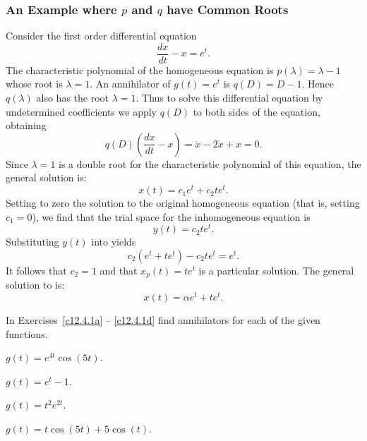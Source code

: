 \documentclass{ximera}
\begin{document}
\subsubsection*{An Example where $p$ and $q$ have Common Roots}

Consider the first order differential equation
\begin{equation}  \label{E:exer4}
\frac{dx}{dt} - x = e^t.
\end{equation}
The characteristic polynomial of the homogeneous equation is 
$p(\lambda)=\lambda-1$ whose root is $\lambda=1$.  An 
annihilator of 
$g(t)=e^t$ is $q(D)=D-1$.  Hence $q(\lambda)$ also has the root $\lambda=1$.
Thus to solve this differential equation by 
undetermined coefficients we
apply $q(D)$ to both sides of the equation, obtaining
\[
q(D) \left(\frac{dx}{dt} - x\right) = \ddot{x} -2\dot{x} +x =0.
\]
Since $\lambda=1$ is a double root for the characteristic polynomial of this 
equation, the general solution is:
\[
x(t) = c_1e^t + c_2te^t.
\]
Setting to zero the solution to the original homogeneous equation (that is, 
setting $c_1=0$), we find that the trial space
for the inhomogeneous equation 
 is
\[
y(t) = c_2te^t.
\] 
Substituting $y(t)$ into  yields
\[
c_2(e^t + te^t) - c_2te^t = e^t.
\] 
It follows that $c_2=1$ and that $x_p(t) = te^t$ is a particular solution. 
The general solution to  is:
\[
x(t) = \alpha e^t + te^t.
\]


\EXER

\TEXER

\noindent In Exercises~\ref{c12.4.1a} -- \ref{c12.4.1d} find annihilators 
for each of the given functions.
\begin{exercise}  \label{c12.4.1a}
$g(t) = e^{4t}\cos(5t)$.
\end{exercise}
\begin{exercise}  \label{c12.4.1b}
$g(t) = e^t-1$.
\end{exercise}
\begin{exercise}  \label{c12.4.1c}
$g(t) = t^2e^{2t}$.
\end{exercise}
\begin{exercise}  \label{c12.4.1d}
$g(t) = t\cos(5t)+5\cos(t)$.
\end{exercise}
\end{document}
